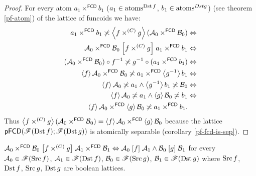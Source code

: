 \begin{proof}
For every atom $a_{1}\times^{\mathsf{FCD}}b_{1}$ ($a_{1}\in\operatorname{atoms}^{\operatorname{Dst} f}$,
$b_{1}\in\operatorname{atoms}^{Dstg}$) (see theorem \ref{pf-atom}) of the lattice
of funcoids we have:
\begin{align*}
a_{1}\times^{\mathsf{FCD}}b_{1}\not\asymp\left\langle f\times^{(C)}g\right\rangle(\mathcal{A}_{0}\times^{\mathsf{FCD}}\mathcal{B}_{0}) & \Leftrightarrow\\
\mathcal{A}_{0}\times^{\mathsf{FCD}}\mathcal{B}_{0}\mathrel{\left[f\times^{(C)}g\right]}a_{1}\times^{\mathsf{FCD}}b_{1} & \Leftrightarrow\\
(\mathcal{A}_{0}\times^{\mathsf{FCD}}\mathcal{B}_{0})\circ f^{-1}\not\asymp g^{-1}\circ(a_{1}\times^{\mathsf{FCD}}b_{1}) & \Leftrightarrow\\
\left\langle f\right\rangle\mathcal{A}_{0}\times^{\mathsf{FCD}}\mathcal{B}_{0}\not\asymp a_{1}\times^{\mathsf{FCD}}\left\langle g^{-1}\right\rangle b_{1} & \Leftrightarrow\\
\left\langle f\right\rangle\mathcal{A}_{0}\not\asymp a_{1}\land\left\langle g^{-1}\right\rangle b_{1}\not\asymp\mathcal{B}_{0} & \Leftrightarrow\\
\left\langle f\right\rangle\mathcal{A}_{0}\not\asymp a_{1}\land\left\langle g\right\rangle\mathcal{B}_{0}\not\asymp b_{1} & \Leftrightarrow\\
\left\langle f\right\rangle\mathcal{A}_{0}\times^{\mathsf{FCD}}\left\langle g\right\rangle\mathcal{B}_{0}\not\asymp a_{1}\times^{\mathsf{FCD}}b_{1}.
\end{align*}
Thus $\left\langle f\times^{(C)}g\right\rangle(\mathcal{A}_{0}\times^{\mathsf{FCD}}\mathcal{B}_{0})=\left\langle f\right\rangle\mathcal{A}_{0}\times^{\mathsf{FCD}}\left\langle g\right\rangle\mathcal{B}_{0}$
because the lattice $\mathsf{pFCD}(\mathscr{F}(\operatorname{Dst} f);\mathscr{F}(\operatorname{Dst} g))$
is atomically separable (corollary \ref{pf-fcd-is-sep}).\end{proof}
\begin{cor}
$\mathcal{A}_{0}\times^{\mathsf{FCD}}\mathcal{B}_{0}\mathrel{\left[f\times^{(C)}g\right]}\mathcal{A}_{1}\times^{\mathsf{FCD}}\mathcal{B}_{1}\Leftrightarrow\mathcal{A}_{0}\mathrel{\left[f\right]}\mathcal{A}_{1}\wedge\mathcal{B}_{0}\mathrel{\left[g\right]}\mathcal{B}_{1}$
for every $\mathcal{A}_{0}\in\mathscr{F}(\operatorname{Src} f)$, $\mathcal{A}_{1}\in\mathscr{F}(\operatorname{Dst} f)$,
$\mathcal{B}_{0}\in\mathscr{F}(\operatorname{Src} g)$, $\mathcal{B}_{1}\in\mathscr{F}(\operatorname{Dst} g)$
where $\operatorname{Src} f$, $\operatorname{Dst} f$, $\operatorname{Src} g$, $\operatorname{Dst} g$ are boolean lattices.\end{cor}
